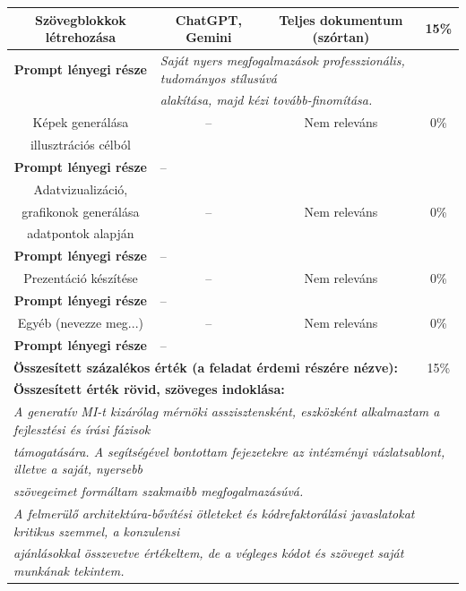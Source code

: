 {{\begin{tabular}{|c|c|c|c|}
			Szövegblokkok létrehozása & ChatGPT, Gemini & Teljes dokumentum (szórtan) & 15\% \\ \hline
			\textbf{Prompt lényegi része}  &\multicolumn{3}{|l|}{\textit{Saját nyers megfogalmazások professzionális, tudományos stílusúvá}} \\
								&\multicolumn{3}{|l|}{\textit{alakítása, majd kézi tovább-finomítása.}} \\ \hline \hline

			Képek generálása & -- & Nem releváns & 0\% \\
			illusztrációs célból & & & \\ \hline
			\textbf{Prompt lényegi része}  &\multicolumn{3}{|l|}{--} \\ \hline \hline

			Adatvizualizáció, & & & \\
			grafikonok generálása & -- & Nem releváns & 0\% \\
			adatpontok alapján & & & \\ \hline
			\textbf{Prompt lényegi része}  &\multicolumn{3}{|l|}{--} \\ \hline \hline

			Prezentáció készítése & -- & Nem releváns & 0\% \\ \hline
			\textbf{Prompt lényegi része}  &\multicolumn{3}{|l|}{--} \\ \hline \hline

			Egyéb (nevezze meg...) & -- & Nem releváns & 0\% \\ \hline
			\textbf{Prompt lényegi része}  &\multicolumn{3}{|l|}{--} \\ \hline

			\multicolumn{3}{|l|}{\textbf{Összesített százalékos érték (a feladat érdemi részére nézve):}} & 15\% \\ \hline
			\multicolumn{4}{|l|}{\textbf{Összesített érték rövid, szöveges indoklása:}} \\ 
			\multicolumn{4}{|l|}{\textit{A generatív MI-t kizárólag mérnöki asszisztensként, eszközként alkalmaztam a fejlesztési és írási fázisok}} \\ 
			\multicolumn{4}{|l|}{\textit{támogatására. A segítségével bontottam fejezetekre az intézményi vázlatsablont, illetve a saját, nyersebb}} \\ 
			\multicolumn{4}{|l|}{\textit{szövegeimet formáltam szakmaibb megfogalmazásúvá.}} \\
			\multicolumn{4}{|l|}{\textit{A felmerülő architektúra-bővítési ötleteket és kódrefaktorálási javaslatokat kritikus szemmel, a konzulensi}} \\
			\multicolumn{4}{|l|}{\textit{ajánlásokkal összevetve értékeltem, de a végleges kódot és szöveget saját munkának tekintem.}} \\ \hline
	\end{tabular}
	}	%
}	%


